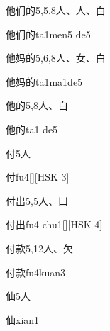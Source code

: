 \begin{entry}{他们的}{5,5,8}{⼈、⼈、⽩}
  \begin{phonetics}{他们的}{ta1men5 de5}
  \end{phonetics}
\end{entry}

\begin{entry}{他妈的}{5,6,8}{⼈、⼥、⽩}
  \begin{phonetics}{他妈的}{ta1ma1de5}
  \end{phonetics}
\end{entry}

\begin{entry}{他的}{5,8}{⼈、⽩}
  \begin{phonetics}{他的}{ta1 de5}
  \end{phonetics}
\end{entry}

\begin{entry}{付}{5}{⼈}
  \begin{phonetics}{付}{fu4}[][HSK 3]
  \end{phonetics}
\end{entry}

\begin{entry}{付出}{5,5}{⼈、⼐}
  \begin{phonetics}{付出}{fu4 chu1}[][HSK 4]
  \end{phonetics}
\end{entry}

\begin{entry}{付款}{5,12}{⼈、⽋}
  \begin{phonetics}{付款}{fu4kuan3}
  \end{phonetics}
\end{entry}

\begin{entry}{仙}{5}{⼈}
  \begin{phonetics}{仙}{xian1}
  \end{phonetics}
\end{entry}

